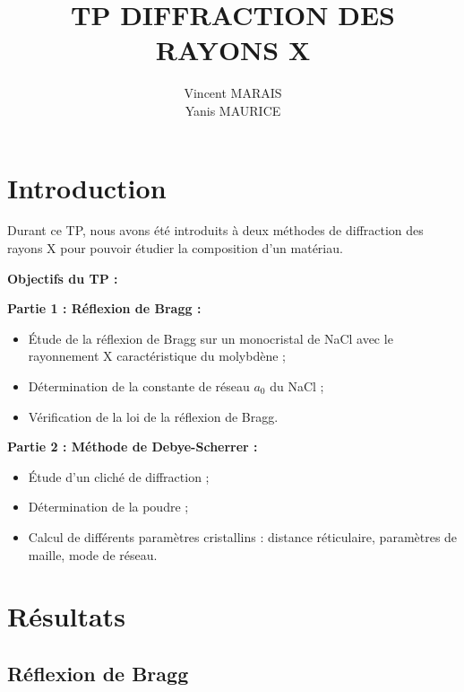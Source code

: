 \documentclass[12pt,a4paper]{article}
\title{TP DIFFRACTION DES RAYONS X}
\author{\textup{Vincent MARAIS \\
		Yanis MAURICE}}
\begin{document}
	


\newpage
\tableofcontents

\newpage
\listoffigures
\listoftables

\newpage
	


\clearpage
{}

	

	
	
	

\section{Introduction}
	
Durant ce TP, nous avons été introduits à deux méthodes de diffraction des rayons X pour pouvoir étudier la composition d’un matériau.
\begin{flushleft}
	\textbf{Objectifs du TP :}
	
	\textbf{Partie 1 : Réflexion de Bragg :}
	\begin{itemize}
		\item Étude de la réflexion de Bragg sur un monocristal de NaCl avec le rayonnement X caractéristique du molybdène ;
		\item Détermination de la constante de réseau $a_0$ du NaCl ;
		\item Vérification de la loi de la réflexion de Bragg.
	\end{itemize}

\vspace{0.2cm}
	\textbf{Partie 2 : Méthode de Debye-Scherrer :}
	\begin{itemize}
		\item Étude d’un cliché de diffraction  ;
		\item Détermination de la poudre  ;
		\item Calcul de différents paramètres cristallins : distance réticulaire, paramètres de maille, mode de réseau.
	\end{itemize}
\end{flushleft}


\vspace{-0.4cm}
\section{Résultats}

\subsection{Réflexion de Bragg}
\end{document}
